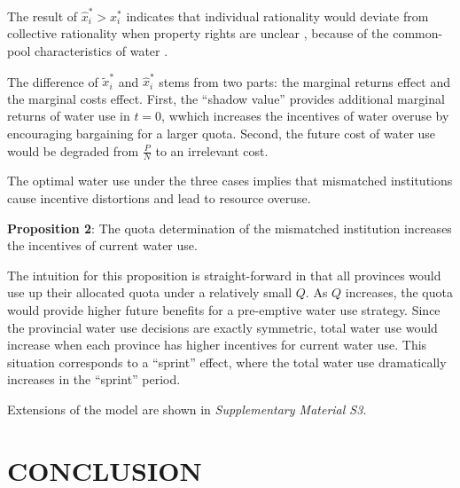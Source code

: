 \documentclass{../nsr}
\begin{document}
The result of $\hat x_i^*>x_i^*$ indicates that individual rationality would deviate from collective rationality when property rights are unclear \cite{hardinTragedyCommons2009}, because of the common-pool characteristics of water
\cite{castilla-rhoGroundwaterCommonPool2020,ostromGeneralFrameworkAnalyzing2009}.

The difference of $\widetilde x_i^*$ and $\hat x_i^*$ stems from two parts: the marginal returns effect and the marginal costs effect. First, the “shadow value” provides additional marginal returns of water use in $t=0$, wwhich increases the incentives of water overuse by encouraging bargaining for a larger quota. Second, the future cost of water use would be degraded from $\frac{P}{N}$ to an irrelevant cost.

The optimal water use under the three cases implies that mismatched institutions cause incentive distortions and lead to resource overuse.

\textbf{Proposition 2}: The quota determination of the mismatched institution increases the incentives of current water use.

The intuition for this proposition is straight-forward in that all provinces would use up their allocated quota under a relatively small $Q$. As $Q$ increases, the quota would provide higher future benefits for a pre-emptive water use strategy. Since the provincial water use decisions are exactly symmetric, total water use would increase when each province has higher incentives for current water use. This situation corresponds to a “sprint” effect, where the total water use dramatically increases in the “sprint” period.

Extensions of the model are shown in \textit{Supplementary Material S3}.


\section{CONCLUSION}\label{conclusion}


\appendix
\label{appendix}




\end{document}
